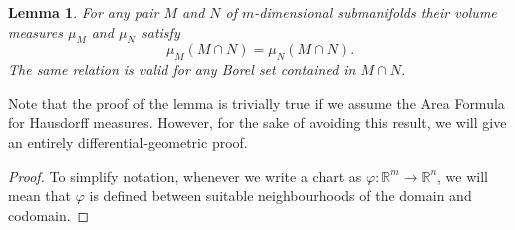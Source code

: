 \documentclass[%
 aip,
 amsmath,amssymb,
 reprint,%
jmp]{revtex4-2}
\newtheorem{lemma}{Lemma}[section]
\begin{document}
\begin{lemma}\label{LemaIntersección}
For any pair $M$ and $N$ of $m$-dimensional submanifolds their volume measures $\mu_{M}$ and $\mu_{N}$ satisfy
\begin{equation*}
    \mu_{M}(M\cap N) = \mu_{N}(M\cap N).
\end{equation*}
The same relation is valid for any Borel set contained in $M\cap N$.
\end{lemma}
Note that the proof of the lemma is trivially true if we assume the Area Formula for Hausdorff measures. However, for the sake of avoiding this result, we will give an entirely differential-geometric proof.
\begin{proof}
To simplify notation, whenever we write a chart as $\varphi\colon \mathbb{R}^{m} \to \mathbb{R}^{n}$, we will mean that $\varphi$ is defined between suitable neighbourhoods of the domain and codomain.


\end{proof}
\end{document}
